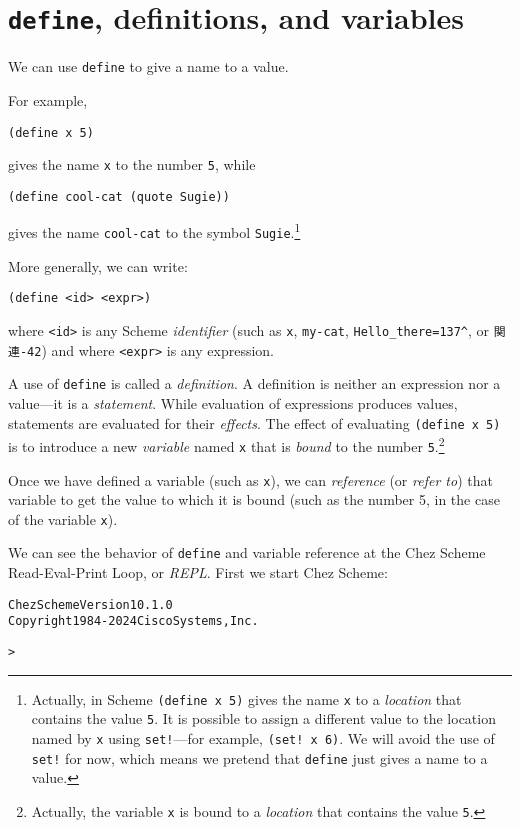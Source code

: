 \documentclass{book}
\begin{document}
\section{\texttt{define}, definitions, and variables}

We can use \verb|define| to give a name to a value.

For example,

\verb|(define x 5)|

\noindent
gives the name \verb|x| to the number \verb|5|, while

\verb|(define cool-cat (quote Sugie))|

\noindent
gives the name \verb|cool-cat| to the symbol \verb|Sugie|.\footnote{Actually, in Scheme \texttt{(define x 5)} gives the name \texttt{x} to a \emph{location} that contains the value \texttt{5}.  It is possible to assign a different value to the location named by \texttt{x} using \texttt{set!}---for example, \texttt{(set! x 6)}.  We will avoid the use of \texttt{set!} for now, which means we pretend that \texttt{define} just gives a name to a value.}

More generally, we can write:

\verb|(define <id> <expr>)|

\noindent
where \verb|<id>| is any Scheme \emph{identifier} (such as \verb|x|, \verb|my-cat|, \verb|Hello_there=137^|, or \verb|関連-42|) and where \verb|<expr>| is any expression.

A use of \verb|define| is called a \emph{definition}. %
A definition is neither an expression nor a value---it is a \emph{statement}.  While evaluation of expressions produces values, statements are evaluated for their \emph{effects}.  The effect of evaluating \verb|(define x 5)| is to introduce a new \emph{variable} named \verb|x| that is \emph{bound} to the number \verb|5|.\footnote{Actually, the variable \texttt{x} is bound to a \emph{location} that contains the value \texttt{5}.}

Once we have defined a variable (such as \verb|x|), we can \emph{reference} (or \emph{refer to}) that variable to get the value to which it is bound (such as the number 5, in the case of the variable \verb|x|).

We can see the behavior of \verb|define| and variable reference at the Chez Scheme Read-Eval-Print Loop, or \emph{REPL}.  First we start Chez Scheme: 

\begin{alltt}
Chez Scheme Version 10.1.0
Copyright 1984-2024 Cisco Systems, Inc.

> 
\end{alltt}
\end{document}

